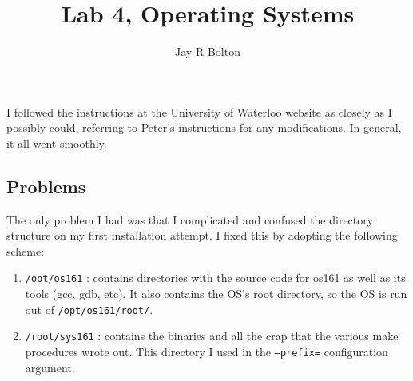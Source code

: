 \documentclass{article}
\title{Lab 4, Operating Systems}
\author{Jay R Bolton}
\begin{document}
\maketitle

I followed the instructions at the University of Waterloo website as
closely as I possibly could, referring to Peter's instructions for
any modifications. In general, it all went smoothly.

\subsection{Problems}

The only problem I had was that I complicated and confused the directory structure on my first installation attempt. I fixed this by adopting the following scheme:

\begin{enumerate}
\item \texttt{/opt/os161} : contains directories with the source code
for os161 as well as its tools (gcc, gdb, etc). It also contains the
  OS's root directory, so the OS is run out of
  \texttt{/opt/os161/root/}.
\item \texttt{/root/sys161} : contains the binaries and all the crap
that the various make procedures wrote out. This directory I used in
the \texttt{--prefix=} configuration argument.
\end{enumerate}
\end{document}

